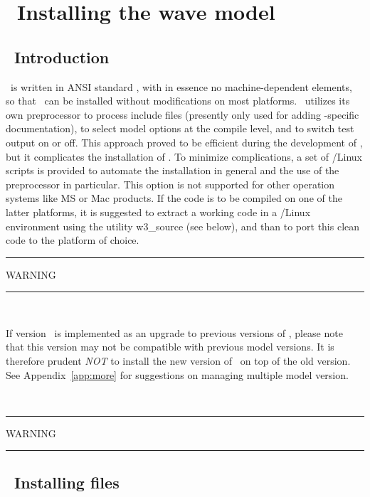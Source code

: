 
\section{~Installing the wave model} \label{chapt:impl}
\newcounters
\vssub
\subsection{~Introduction}
\vssub

\ws\ is written in ANSI standard , with in essence no
machine-dependent elements, so that \ws\ can be installed without
modifications on most platforms. \ws\ utilizes its own preprocessor to process
include files (presently only used for adding \ncep-specific documentation),
to select model options at the compile level, and to switch test output on or
off. This approach proved to be efficient during the development of \ws, but
it complicates the installation of \ws. To minimize complications, a set of
\unix/Linux scripts is provided to automate the installation in general and
the use of the preprocessor in particular. This option is not supported for
other operation systems like MS or Mac products. If the code is to be compiled
on one of the latter platforms, it is suggested to extract a working code in a
\unix/Linux environment using the utility {\code w3\_source} (see below), and
than to port this clean code to the platform of choice.

\begin{center}
\rule[1mm]{55mm}{1.0mm} WARNING \rule[1mm]{55mm}{1.0mm} \\ 
\vspace{\baselineskip}
\parbox{120mm}{If version \WWver\ is implemented as an upgrade to previous
versions of \ws, please note that this version may not be compatible with
previous model versions. It is therefore prudent {\it NOT} to install the new
version of \ws\ on top of the old version. See Appendix~\ref{app:more} for
suggestions on managing multiple model version.} \\ \vspace{\baselineskip}
\rule[1mm]{55mm}{1.0mm} WARNING \rule[1mm]{55mm}{1.0mm}
\end{center}


\vssub
\subsection{~Installing files}\label{sec:install}
\vssub

